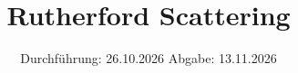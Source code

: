 

\subject{V16}
\title{Rutherford Scattering}
\date{%
  Durchführung: 26.10.2026
  \hspace{3em}
  Abgabe: 13.11.2026
}


\maketitle
\thispagestyle{empty}
\tableofcontents
\newpage








\printbibliography{}




